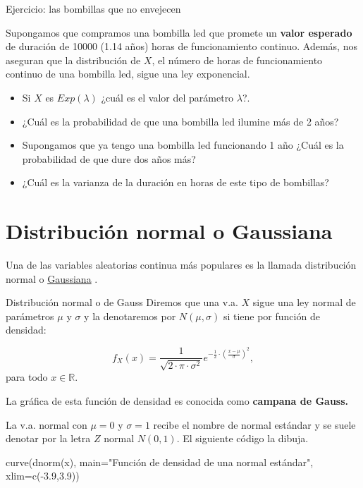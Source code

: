 \documentclass[
  letterpaper,
  DIV=11,
  numbers=noendperiod]{scrreprt}
\newenvironment{Shaded}{\begin{snugshade}}{\end{snugshade}}
\newcommand{\AttributeTok}[1]{\textcolor[rgb]{0.40,0.45,0.13}{#1}}
\newcommand{\FloatTok}[1]{\textcolor[rgb]{0.68,0.00,0.00}{#1}}
\newcommand{\FunctionTok}[1]{\textcolor[rgb]{0.28,0.35,0.67}{#1}}
\newcommand{\NormalTok}[1]{\textcolor[rgb]{0.00,0.23,0.31}{#1}}
\newcommand{\SpecialCharTok}[1]{\textcolor[rgb]{0.37,0.37,0.37}{#1}}
\newcommand{\StringTok}[1]{\textcolor[rgb]{0.13,0.47,0.30}{#1}}
\providecommand{\tightlist}{%
  \setlength{\itemsep}{0pt}\setlength{\parskip}{0pt}}\usepackage{longtable,booktabs,array}
\begin{document}
\begin{Ejercicio}{Ejercicio: las bombillas que no envejecen}{}

Supongamos que compramos una bombilla led que promete un \textbf{valor
esperado} de duración de 10000 (1.14 años) horas de funcionamiento
continuo. Además, nos aseguran que la distribución de \(X\), el número
de horas de funcionamiento continuo de una bombilla led, sigue una ley
exponencial.

\begin{itemize}
\tightlist
\item
  Si \(X\) es \(Exp(\lambda)\) ¿cuál es el valor del parámetro
  \(\lambda\)?.
\item
  ¿Cuál es la probabilidad de que una bombilla led ilumine más de 2
  años?
\item
  Supongamos que ya tengo una bombilla led funcionando 1 año ¿Cuál es la
  probabilidad de que dure dos años más?
\item
  ¿Cuál es la varianza de la duración en horas de este tipo de
  bombillas?
\end{itemize}

\end{Ejercicio}

\section{Distribución normal o
Gaussiana}\label{distribuciuxf3n-normal-o-gaussiana}

Una de las variables aleatorias continua más populares es la llamada
distribución normal o
\href{https://es.wikipedia.org/wiki/Distribuci\%C3\%B3n_normal}{Gaussiana}
.

Distribución normal o de Gauss Diremos que una v.a. \(X\) sigue una ley
normal de parámetros \(\mu\) y \(\sigma\) y la denotaremos por
\(N(\mu,\sigma)\) si tiene por función de densidad:

\[
f_{X}(x)=\frac1{\sqrt{2\cdot\pi\cdot\sigma^2}}
e^{-\frac{1}{2}\cdot\left(\frac{x-\mu}{\sigma}\right)^2},
\] para todo \(x\in \mathbb{R}.\)

La gráfica de esta función de densidad es conocida como \textbf{campana
de Gauss.}

La v.a. normal con \(\mu=0\) y \(\sigma=1\) recibe el nombre de normal
estándar y se suele denotar por la letra \(Z\) normal \(N(0,1)\). El
siguiente código la dibuja.

\begin{Shaded}
\begin{Highlighting}[]
\FunctionTok{curve}\NormalTok{(}\FunctionTok{dnorm}\NormalTok{(x),}
      \AttributeTok{main=}\StringTok{"Función de densidad de una normal estándar"}\NormalTok{,}
      \AttributeTok{xlim=}\FunctionTok{c}\NormalTok{(}\SpecialCharTok{{-}}\FloatTok{3.9}\NormalTok{,}\FloatTok{3.9}\NormalTok{))}
\end{Highlighting}
\end{Shaded}
\end{document}
